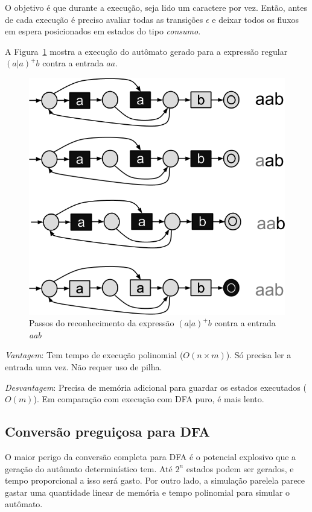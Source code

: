 \documentclass[a4paper,12pt,oneside,onecolumn]{uerj}
\begin{document}
O objetivo é que durante a execução, seja lido um caractere por vez. Então, antes de cada execução é preciso avaliar todas as transições $\epsilon$ e deixar todos os fluxos em espera posicionados em estados do tipo \emph{consumo}.

A Figura~\ref{fig:nfa_simultaneo} mostra a execução do autômato gerado para a expressão regular $(a|a)^+b$ contra a entrada $aa$.

\begin{figure}[!htbp]
  \centering
  \includegraphics[scale=0.5]{figures/nfa_simultaneo.png}
  \caption{Passos do reconhecimento da expressão $(a|a)^+b$ contra a entrada \emph{aab}}
  \label{fig:nfa_simultaneo}
\end{figure}

\emph{Vantagem}: Tem tempo de execução polinomial ($O(n \times m)$). Só precisa ler a entrada uma vez. Não requer uso de pilha.

\emph{Desvantagem}: Precisa de memória adicional para guardar os estados executados ($O(m)$). Em comparação com execução com DFA puro, é mais lento.

\subsection{Conversão preguiçosa para DFA}

O maior perigo da conversão completa para DFA é o potencial explosivo que a geração do autômato determinístico tem. Até $2^n$ estados podem ser gerados, e tempo proporcional a isso será gasto. Por outro lado, a simulação parelela parece gastar uma quantidade linear de memória e tempo polinomial para simular o autômato.
\end{document}
